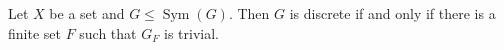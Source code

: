 \documentclass[preview]{standalone}
\begin{document}
\begin{center}
Let $X$ be a set and $G \leq \operatorname{Sym}(G)$. Then $G$ is discrete if and only if there is a finite set $F$ such that $G_F$ is trivial.
\end{center}
\end{document}
